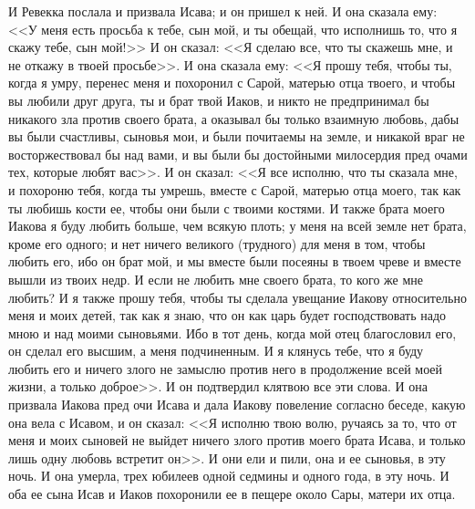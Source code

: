 И Ревекка послала и призвала Исава; и он пришел
к ней. И она сказала ему: <<У меня есть просьба к
тебе, сын мой, и ты обещай, что исполнишь то, что я
скажу тебе, сын мой!>> И он сказал: <<Я сделаю
все, что ты скажешь мне, и не откажу в твоей
просьбе>>. И она сказала ему: <<Я прошу тебя,
чтобы ты, когда я умру, перенес меня и похоронил с
Сарой, матерью отца твоего, и чтобы вы любили друг
друга, ты и брат твой Иаков, и никто не
предпринимал бы никакого зла против своего
брата, а оказывал бы только взаимную любовь, дабы
вы были счастливы, сыновья мои, и были почитаемы
на земле, и никакой враг не восторжествовал бы
над вами, и вы были бы достойными милосердия пред
очами тех, которые любят вас>>. И он сказал: <<Я
все исполню, что ты сказала мне, и похороню тебя,
когда ты умрешь, вместе с Сарой, матерью отца
моего, так как ты любишь кости ее, чтобы они были с
твоими костями. И также брата моего Иакова я буду
любить больше, чем всякую плоть; у меня на всей
земле нет брата, кроме его одного; и нет ничего
великого (трудного) для меня в том, чтобы любить
его, ибо он брат мой, и мы вместе были посеяны в
твоем чреве и вместе вышли из твоих недр. И если
не любить мне своего брата, то кого же мне любить?
И я также прошу тебя, чтобы ты сделала увещание
Иакову относительно меня и моих детей, так как я
знаю, что он как царь будет господствовать надо
мною и над моими сыновьями. Ибо в тот день, когда
мой отец благословил его, он сделал его высшим, а
меня подчиненным. И я клянусь тебе, что я буду
любить его и ничего злого не замыслю против него
в продолжение всей моей жизни, а только
доброе>>. И он подтвердил клятвою все эти слова.
И она призвала Иакова пред очи Исава и дала Иакову
повеление согласно беседе, какую она вела с
Исавом, и он сказал: <<Я исполню твою волю,
ручаясь за то, что от меня и моих сыновей не
выйдет ничего злого против моего брата Исава, и
только лишь одну любовь встретит он>>. И они ели
и пили, она и ее сыновья, в эту ночь. И она умерла,
трех юбилеев одной седмины и одного года, в эту
ночь. И оба ее сына Исав и Иаков похоронили ее в
пещере около Сары, матери их отца.

